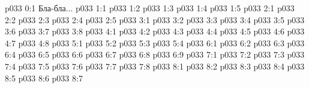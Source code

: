 \author{Глава архангелов}
\vs p033 0:1  Бла-бла...
\vs p033 1:1 
\vs p033 1:2 
\vs p033 1:3 
\vs p033 1:4 
\vs p033 1:5 \pc 
{}
\vs p033 2:1 
\vs p033 2:2 
\vs p033 2:3 \pc 
\vs p033 2:4 
\vs p033 2:5 \pc 
{}
\vs p033 3:1 
\vs p033 3:2 \pc 
\vs p033 3:3 \pc 
\vs p033 3:4 \pc 
\vs p033 3:5 
\vs p033 3:6 
\vs p033 3:7 
\vs p033 3:8 \pc 
{}
\vs p033 4:1 
\vs p033 4:2 
\vs p033 4:3 
\vs p033 4:4 \pc 
\vs p033 4:5 
\vs p033 4:6 
\vs p033 4:7 \pc 
\vs p033 4:8 
\vs p033 5:1 
\vs p033 5:2 
\vs p033 5:3 
\vs p033 5:4 
\vs p033 6:1 
\vs p033 6:2 
\vs p033 6:3 \pc 
\vs p033 6:4 \pc 
\vs p033 6:5 \pc 
\vs p033 6:6 
\vs p033 6:7 \pc 
\vs p033 6:8 
\vs p033 6:9 
\vs p033 7:1 
\vs p033 7:2 
\vs p033 7:3 
\vs p033 7:4 
\vs p033 7:5 
\vs p033 7:6 
\vs p033 7:7 \pc 
\vs p033 7:8 
\vs p033 8:1 
\vs p033 8:2 
\vs p033 8:3 \pc 
\vs p033 8:4 \pc 
\vs p033 8:5 \pc 
\vs p033 8:6 
\vsetoff
\vs p033 8:7 
\quizlink

